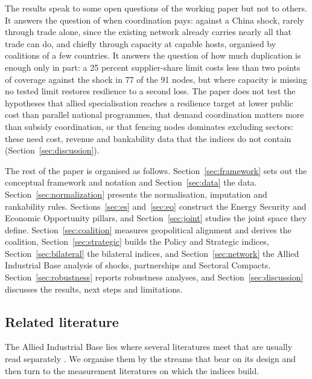 The results speak to some open questions of the working paper
\citep[Section 10]{neis2026allied} but not to others. It answers the question of when coordination
pays: against a China shock, rarely through trade alone, since the existing network already carries
nearly all that trade can do, and chiefly through capacity at capable hosts, organised by coalitions
of a few countries. It answers the question of how much duplication is enough only in part: a 25
percent supplier-share limit costs less than two points of coverage against the shock in 77 of the
91 nodes, but where capacity is missing no tested limit restores resilience to a second loss. The paper does not test the hypotheses that allied specialisation reaches a
resilience target at lower public cost than parallel national programmes, that demand coordination matters more than subsidy coordination, or that fencing
nodes dominates excluding sectors: these need cost, revenue and bankability data that the indices
do not contain (Section~\ref{sec:discussion}).

The rest of the paper is organised as follows. Section~\ref{sec:framework} sets out the
conceptual framework and notation and Section~\ref{sec:data} the data.
Section~\ref{sec:normalization} presents the normalisation, imputation and rankability rules.
Sections~\ref{sec:es} and~\ref{sec:eo} construct the Energy Security and Economic Opportunity
pillars, and Section~\ref{sec:joint} studies the joint space they define.
Section~\ref{sec:coalition} measures geopolitical alignment and derives the coalition,
Section~\ref{sec:strategic} builds the Policy and Strategic indices, Section~\ref{sec:bilateral}
the bilateral indices, and Section~\ref{sec:network} the Allied Industrial Base analysis of shocks,
partnerships and Sectoral Compacts.
Section~\ref{sec:robustness} reports robustness analyses, and Section~\ref{sec:discussion}
discusses the results, next steps and limitations.

\subsection{Related literature}\label{subsec:literature}

The Allied Industrial Base lies where several literatures meet that are usually read separately
\citep{neis2026allied}. We organise them by the streams that bear on its design and then turn to
the measurement literatures on which the indices build.

